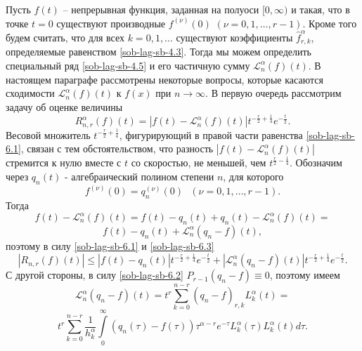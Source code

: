 Пусть $f(t)$ -- непрерывная функция, заданная на полуоси $[0,\infty)$ и такая, что в точке $t=0$ существуют производные $f^{(\nu)}(0)$ $(\nu=0,1,\dots,r-1)$. Кроме того будем считать, что для всех $k=0,1,\ldots$ существуют коэффициенты $\hat{f}_{r,k}^\alpha$, определяемые равенством \eqref{sob-lag-sb-4.3}. Тогда мы можем определить специальный ряд \eqref{sob-lag-sb-4.5} и его частичную сумму $\mathcal{L}_n^\alpha(f)(t)$. В настоящем параграфе  рассмотрены некоторые вопросы, которые касаются  сходимости $\mathcal{L}_n^\alpha(f)(t)$ к $f(x)$ при $n\to\infty$. В первую очередь рассмотрим задачу об оценке величины
\begin{equation}\label{sob-lag-sb-6.1}
  R_{n,r}^\alpha(f)(t)=|f(t)-\mathcal{L}_n^\alpha(f)(t)|t^{-\frac r2+\frac14}e^{-\frac t2}.
\end{equation}
Весовой множитель $t^{-\frac r2+\frac14}$, фигурирующий в правой части равенства \eqref{sob-lag-sb-6.1}, связан с тем обстоятельством, что разность
$|f(t)-\mathcal{L}_n^\alpha(f)(t)|$ стремится к нулю вместе с $t$ со скоростью, не меньшей, чем  $t^{\frac r2-\frac14}$.
Обозначим через $q_n(t)$ - алгебраический полином степени $n$, для которого
\begin{equation}\label{sob-lag-sb-6.2}
  f^{(\nu)}(0)=q_n^{(\nu)}(0)\text{ }(\nu=0,1,\ldots,r-1).
\end{equation}
Тогда
\begin{equation*}
  f(t)-\mathcal{L}_n^\alpha(f)(t)=f(t)-q_n(t)+q_n(t)-\mathcal{L}_n^\alpha(f)(t)=
\end{equation*}
\begin{equation}\label{sob-lag-sb-6.3}
  f(t)-q_n(t)+\mathcal{L}_n^\alpha(q_n-f)(t),
\end{equation}
поэтому в силу \eqref{sob-lag-sb-6.1} и \eqref{sob-lag-sb-6.3}
\begin{equation}\label{sob-lag-sb-6.4}
  |R_{n,r}(f)(t)|\le|f(t)-q_n(t)|t^{-\frac r2+\frac14}e^{-\frac t2}+|\mathcal{L}_n^\alpha(q_n-f)(t)|t^{-\frac r2+\frac14}e^{-\frac t2}.
\end{equation}
С другой стороны, в силу \eqref{sob-lag-sb-6.2} $P_{r-1}(q_n-f)\equiv0$, поэтому  имеем
\begin{equation*}
  \mathcal{L}_n^\alpha(q_n-f)(t)=t^r\sum\limits_{k=0}^{n-r}(\widehat{q_n-f})_{r,k}L_k^\alpha(t)=
\end{equation*}
\begin{equation*}
  t^r\sum\limits_{k=0}^{n-r}\frac1{h_k^\alpha}\int\limits_0^\infty(q_n(\tau)-f(\tau))\tau^{\alpha-r}e^{-\tau}L_k^\alpha(\tau)L_k^\alpha(t)d\tau.
\end{equation*}
